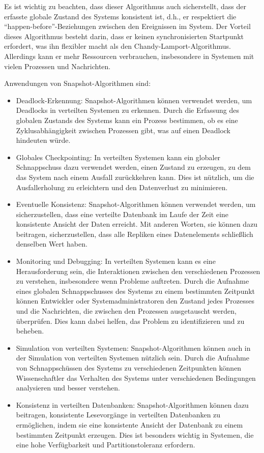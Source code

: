 Es ist wichtig zu beachten, dass dieser Algorithmus auch sicherstellt, dass der erfasste globale Zustand des Systems konsistent ist, d.h., er respektiert die \enquote{happen-before}-Beziehungen zwischen den Ereignissen im System.  Der Vorteil dieses Algorithmus besteht darin, dass er keinen synchronisierten Startpunkt erfordert, was ihn flexibler macht als den Chandy-Lamport-Algorithmus. Allerdings kann er mehr Ressourcen verbrauchen, insbesondere in Systemen mit vielen Prozessen und Nachrichten.

Anwendungen von Snapshot-Algorithmen sind:
\begin{itemize}
\item Deadlock-Erkennung: Snapshot-Algorithmen können verwendet werden, um Deadlocks in verteilten Systemen zu erkennen. Durch die Erfassung des globalen Zustands des Systems kann ein Prozess bestimmen, ob es eine Zyklusabhängigkeit zwischen Prozessen gibt, was auf einen Deadlock hindeuten würde.
\item Globales Checkpointing: In verteilten Systemen kann ein globaler Schnappschuss dazu verwendet werden, einen Zustand zu erzeugen, zu dem das System nach einem Ausfall zurückkehren kann. Dies ist nützlich, um die Ausfallerholung zu erleichtern und den Datenverlust zu minimieren.
\item Eventuelle Konsistenz: Snapshot-Algorithmen können verwendet werden, um sicherzustellen, dass eine verteilte Datenbank im Laufe der Zeit eine konsistente Ansicht der Daten erreicht. Mit anderen Worten, sie können dazu beitragen, sicherzustellen, dass alle Repliken eines Datenelements schließlich denselben Wert haben.
\item Monitoring und Debugging: In verteilten Systemen kann es eine Herausforderung sein, die Interaktionen zwischen den verschiedenen Prozessen zu verstehen, insbesondere wenn Probleme auftreten. Durch die Aufnahme eines globalen Schnappschusses des Systems zu einem bestimmten Zeitpunkt können Entwickler oder Systemadministratoren den Zustand jedes Prozesses und die Nachrichten, die zwischen den Prozessen ausgetauscht werden, überprüfen. Dies kann dabei helfen, das Problem zu identifizieren und zu beheben.
\item Simulation von verteilten Systemen: Snapshot-Algorithmen können auch in der Simulation von verteilten Systemen nützlich sein. Durch die Aufnahme von Schnappschüssen des Systems zu verschiedenen Zeitpunkten können Wissenschaftler das Verhalten des Systems unter verschiedenen Bedingungen analysieren und besser verstehen.
\item Konsistenz in verteilten Datenbanken: Snapshot-Algorithmen können dazu beitragen, konsistente Lesevorgänge in verteilten Datenbanken zu ermöglichen, indem sie eine konsistente Ansicht der Datenbank zu einem bestimmten Zeitpunkt erzeugen. Dies ist besonders wichtig in Systemen, die eine hohe Verfügbarkeit und Partitionstoleranz erfordern.
\end{itemize}

